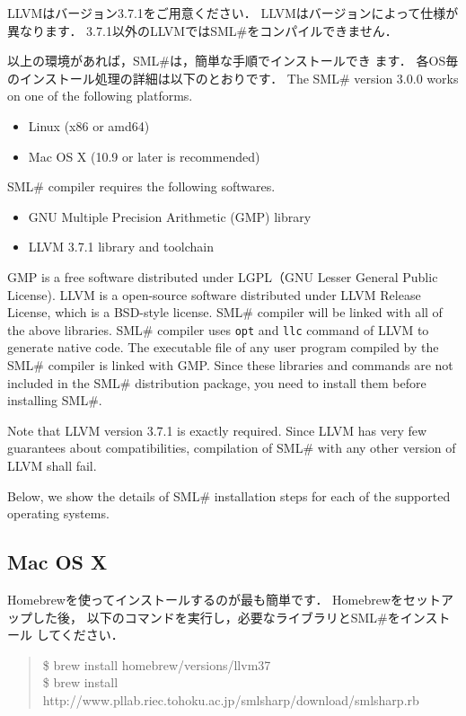 \documentclass{jbook}
\newif\ifjp
\newcommand{\txt}[2]{#1}
\newcommand{\smlsharp}{SML\#}
\newcommand{\version}{3.0.0}
\newenvironment{program}{\begin{quote}\begin{tt}}%
                        {\end{tt}\end{quote}}
\begin{document}
	LLVMはバージョン3.7.1をご用意ください．
	LLVMはバージョンによって仕様が異なります．
	3.7.1以外のLLVMでは\smlsharp{}をコンパイルできません．

	以上の環境があれば，\smlsharp{}は，簡単な手順でインストールでき
ます．
	各OS毎のインストール処理の詳細は以下のとおりです．
\else%
	The \smlsharp{} version \version{} works on one of the following
platforms.
\begin{itemize}
\item Linux (x86 or amd64)
\item Mac OS X (10.9 or later is recommended)
\end{itemize}

	\smlsharp{} compiler requires the following softwares.
\begin{itemize}
\item GNU Multiple Precision Arithmetic (GMP) library
\item LLVM 3.7.1 library and toolchain
\end{itemize}
	GMP is a free software distributed under LGPL（GNU Lesser General
Public License).
	LLVM is a open-source software distributed under LLVM Release License,
which is a BSD-style license.
	\smlsharp{} compiler will be linked with all of the above libraries.
	\smlsharp{} compiler uses {\tt opt} and {\tt llc} command of
LLVM to generate native code.
	The executable file of any user program compiled by the \smlsharp{}
compiler is linked with GMP.
	Since these libraries and commands are not included in the \smlsharp{}
distribution package,
you need to install them before installing \smlsharp.

	Note that LLVM version 3.7.1 is exactly required.
	Since LLVM has very few guarantees about compatibilities,
compilation of \smlsharp{} with any other version of LLVM shall fail.

	Below, we show the details of \smlsharp{} installation steps for
each of the supported operating systems.
\fi%

\subsection{\txt{Mac OS X}{Mac OS X}}
\ifjp%
	Homebrewを使ってインストールするのが最も簡単です．
	Homebrewをセットアップした後，
以下のコマンドを実行し，必要なライブラリと\smlsharp{}をインストール
してください．
\begin{program}
\$ brew install homebrew/versions/llvm37\\
\$ brew install http://www.pllab.riec.tohoku.ac.jp/smlsharp/download/smlsharp.rb
\end{program}
\end{document}
